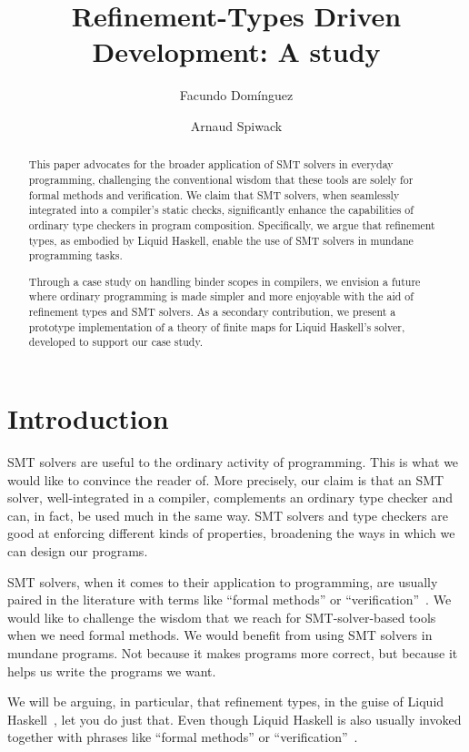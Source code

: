 \documentclass[sigconf]{acmart}
\title{Refinement-Types Driven Development: A study}
\author{Facundo Domínguez}
\affiliation{
     \institution{Tweag}
     \country{France}
}
\author{Arnaud Spiwack}
\affiliation{
     \institution{Tweag}
     \country{France}
}
\begin{document}
\begin{abstract}
    This paper advocates for the broader application of SMT solvers in everyday
    programming, challenging the conventional wisdom that these tools are
    solely for formal methods and verification. We claim that SMT solvers, when
    seamlessly integrated into a compiler's static checks, significantly
    enhance the capabilities of ordinary type checkers in program composition.
    Specifically, we argue that refinement types, as embodied by Liquid Haskell,
    enable the use of SMT solvers in mundane programming tasks.

    Through a case study on handling binder scopes in compilers, we envision a
    future where ordinary programming is made simpler and more enjoyable with the
    aid of refinement types and SMT solvers. As a secondary contribution, we
    present a prototype implementation of a theory of finite maps for Liquid
    Haskell's solver, developed to support our case study.
\end{abstract}
\maketitle

\section{Introduction}

SMT solvers are useful to the ordinary activity of
programming. This is what we would like to convince the reader of. More
precisely, our claim is that an SMT solver, well-integrated in
a compiler, complements an ordinary type checker and can, in fact, be used much in
the same way. SMT solvers and type checkers are good at enforcing different kinds of
properties, broadening the ways in which we can design our programs.

SMT solvers, when it comes to their application to programming, are usually
paired in the literature with terms like ``formal methods'' or
``verification''~\cite{barnett05,demoura08,zinzin17,swamy22,filli13,leino17}. We
would like to challenge the wisdom that we reach for SMT-solver-based tools when
we need formal methods. We would benefit from using SMT solvers in mundane
programs. Not because it makes programs more correct, but because it helps us
write the programs we want.

We will be arguing, in particular, that refinement types, in the guise of Liquid
Haskell~\cite{vazou14b}, let you do just that. Even though Liquid
Haskell is also usually invoked together with phrases like ``formal methods'' or
``verification''~\cite{vazou14,lehmann21,liu20,redmond23}.
\end{document}
